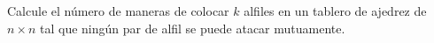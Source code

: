 \begin{statement}{10}
  Calcule el n\'umero de maneras de colocar $k$ alfiles en un tablero de ajedrez
  de $n \times n$ tal que ning\'un par de alfil se puede atacar mutuamente.
\end{statement}